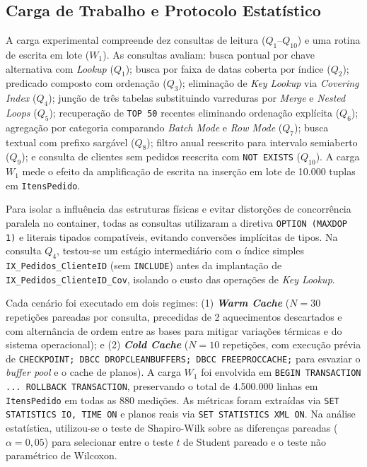 \documentclass[12pt]{article}
\begin{document}
\subsection{Carga de Trabalho e Protocolo Estatístico}

A carga experimental compreende dez consultas de leitura ($Q_1$--$Q_{10}$) e uma rotina de escrita em lote ($W_1$). As consultas avaliam: busca pontual por chave alternativa com \textit{Lookup} ($Q_1$); busca por faixa de datas coberta por índice ($Q_2$); predicado composto com ordenação ($Q_3$); eliminação de \textit{Key Lookup} via \textit{Covering Index} ($Q_4$); junção de três tabelas substituindo varreduras por \textit{Merge} e \textit{Nested Loops} ($Q_5$); recuperação de \texttt{TOP 50} recentes eliminando ordenação explícita ($Q_6$); agregação por categoria comparando \textit{Batch Mode} e \textit{Row Mode} ($Q_7$); busca textual com prefixo sargável ($Q_8$); filtro anual reescrito para intervalo semiaberto ($Q_9$); e consulta de clientes sem pedidos reescrita com \texttt{NOT EXISTS} ($Q_{10}$). A carga $W_1$ mede o efeito da amplificação de escrita na inserção em lote de 10.000 tuplas em \texttt{ItensPedido}.

Para isolar a influência das estruturas físicas e evitar distorções de concorrência paralela no container, todas as consultas utilizaram a diretiva \texttt{OPTION (MAXDOP 1)} e literais tipados compatíveis, evitando conversões implícitas de tipos. Na consulta $Q_4$, testou-se um estágio intermediário com o índice simples \texttt{IX\_Pedidos\_ClienteID} (sem \texttt{INCLUDE}) antes da implantação de \texttt{IX\_Pedidos\_ClienteID\_Cov}, isolando o custo das operações de \textit{Key Lookup}.

Cada cenário foi executado em dois regimes: (1) \textbf{\textit{Warm Cache}} ($N=30$ repetições pareadas por consulta, precedidas de 2 aquecimentos descartados e com alternância de ordem entre as bases para mitigar variações térmicas e do sistema operacional); e (2) \textbf{\textit{Cold Cache}} ($N=10$ repetições, com execução prévia de \texttt{CHECKPOINT; DBCC DROPCLEANBUFFERS; DBCC FREEPROCCACHE;} para esvaziar o \textit{buffer pool} e o cache de planos). A carga $W_1$ foi envolvida em \texttt{BEGIN TRANSACTION ... ROLLBACK TRANSACTION}, preservando o total de 4.500.000 linhas em \texttt{ItensPedido} em todas as 880 medições. As métricas foram extraídas via \texttt{SET STATISTICS IO, TIME ON} e planos reais via \texttt{SET STATISTICS XML ON}. Na análise estatística, utilizou-se o teste de Shapiro-Wilk sobre as diferenças pareadas ($\alpha = 0{,}05$) para selecionar entre o teste $t$ de Student pareado e o teste não paramétrico de Wilcoxon.
\end{document}
